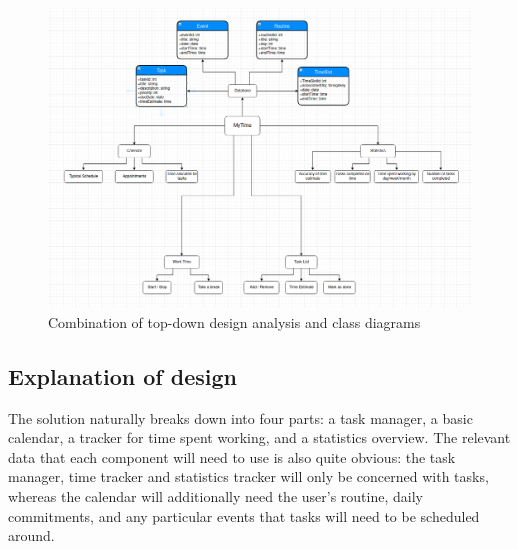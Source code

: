 \documentclass{article}
\begin{document}
\begin{figure}[p]
	\includegraphics[width=\linewidth]{Images/TDD.png}
	\caption{Combination of top-down design analysis and class diagrams}
	\label{fig:TDD1}
\end{figure}

\subsection{Explanation of design}
The solution naturally breaks down into four parts:
a task manager,
a basic calendar,
a tracker for time spent working,
and a statistics overview.
The relevant data that each component will need to use is also quite obvious:
the task manager, time tracker and statistics tracker will only be concerned with tasks,
whereas the calendar will additionally need the user's routine, daily commitments,
and any particular events that tasks will need to be scheduled around.
\end{document}
